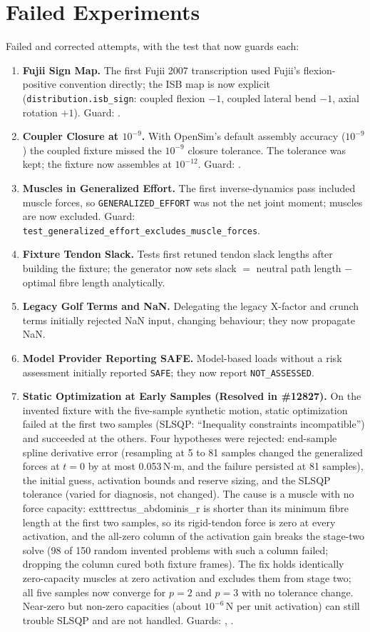 \documentclass[11pt,a4paper]{article}
\begin{document}
\section{Failed Experiments}
Failed and corrected attempts, with the test that now guards each:
\begin{enumerate}
  \item \textbf{Fujii Sign Map.} The first Fujii 2007 transcription used Fujii's flexion-positive convention directly; the ISB map is now explicit (\texttt{distribution.isb\_sign}: coupled flexion $-1$, coupled lateral bend $-1$, axial rotation $+1$). Guard: .
  \item \textbf{Coupler Closure at $10^{-9}$.} With OpenSim's default assembly accuracy ($10^{-9}$) the coupled fixture missed the $10^{-9}$ closure tolerance. The tolerance was kept; the fixture now assembles at $10^{-12}$. Guard: .
  \item \textbf{Muscles in Generalized Effort.} The first inverse-dynamics pass included muscle forces, so \texttt{GENERALIZED\_EFFORT} was not the net joint moment; muscles are now excluded. Guard: \texttt{test\_generalized\_effort\_excludes\_muscle\_forces}.
  \item \textbf{Fixture Tendon Slack.} Tests first retuned tendon slack lengths after building the fixture; the generator now sets slack $=$ neutral path length $-$ optimal fibre length analytically.
  \item \textbf{Legacy Golf Terms and NaN.} Delegating the legacy X-factor and crunch terms initially rejected NaN input, changing behaviour; they now propagate NaN.
  \item \textbf{Model Provider Reporting SAFE.} Model-based loads without a risk assessment initially reported \texttt{SAFE}; they now report \texttt{NOT\_ASSESSED}.
  \item \textbf{Static Optimization at Early Samples (Resolved in \#12827).} On the invented fixture with the five-sample synthetic motion, static optimization failed at the first two samples (SLSQP: ``Inequality constraints incompatible'') and succeeded at the others. Four hypotheses were rejected: end-sample spline derivative error (resampling at 5 to 81 samples changed the generalized forces at $t=0$ by at most 0.053\,N$\cdot$m, and the failure persisted at 81 samples), the initial guess, activation bounds and reserve sizing, and the SLSQP tolerance (varied for diagnosis, not changed). The cause is a muscle with no force capacity: 	exttt{rectus\_abdominis\_r} is shorter than its minimum fibre length at the first two samples, so its rigid-tendon force is zero at every activation, and the all-zero column of the activation gain breaks the stage-two solve (98 of 150 random invented problems with such a column failed; dropping the column cured both fixture frames). The fix holds identically zero-capacity muscles at zero activation and excludes them from stage two; all five samples now converge for $p=2$ and $p=3$ with no tolerance change. Near-zero but non-zero capacities (about $10^{-6}$\,N per unit activation) can still trouble SLSQP and are not handled. Guards: , .

\end{enumerate}
\end{document}
